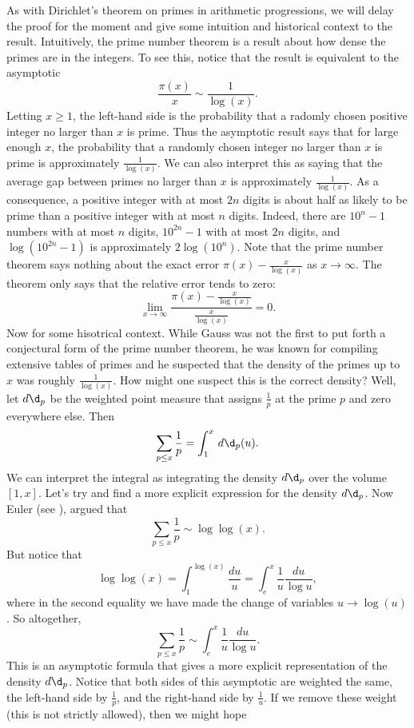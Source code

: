       As with Dirichlet's theorem on primes in arithmetic progressions, we will delay the proof for the moment and give some intuition and historical context to the result. Intuitively, the prime number theorem is a result about how dense the primes are in the integers. To see this, notice that the result is equivalent to the asymptotic
      \[
        \frac{\pi(x)}{x} \sim \frac{1}{\log(x)}.
      \]
      Letting $x \ge 1$, the left-hand side is the probability that a radomly chosen positive integer no larger than $x$ is prime. Thus the asymptotic result says that for large enough $x$, the probability that a randomly chosen integer no larger than $x$ is prime is approximately $\frac{1}{\log(x)}$. We can also interpret this as saying that the average gap between primes no larger than $x$ is approximately $\frac{1}{\log(x)}$. As a consequence, a positive integer with at most $2n$ digits is about half as likely to be prime than a positive integer with at most $n$ digits. Indeed, there are $10^{n}-1$ numbers with at most $n$ digits, $10^{2n}-1$ with at most $2n$ digits, and $\log(10^{2n}-1)$ is approximately $2\log(10^{n})$. Note that the prime number theorem says nothing about the exact error $\pi(x)-\frac{x}{\log(x)}$ as $x \to \infty$. The theorem only says that the relative error tends to zero:
      \[
        \lim_{x \to \infty}\frac{\pi(x)-\frac{x}{\log(x)}}{\frac{x}{\log(x)}} = 0.
      \]
      Now for some hisotrical context. While Gauss was not the first to put forth a conjectural form of the prime number theorem, he was known for compiling extensive tables of primes and he suspected that the density of the primes up to $x$ was roughly $\frac{1}{\log(x)}$. How might one suspect this is the correct density? Well, let $d\d_{p}$ be the weighted point measure that assigns $\frac{1}{p}$ at the prime $p$ and zero everywhere else. Then
      \[
        \sum_{p \le x}\frac{1}{p} = \int_{1}^{x}\,d\d_{p}(u).
      \]
      We can interpret the integral as integrating the density $d\d_{p}$ over the volume $[1,x]$. Let's try and find a more explicit expression for the density $d\d_{p}$. Now Euler (see \cite{euler1744variae}), argued that
      \[
        \sum_{p \le x}\frac{1}{p} \sim \log\log(x).
      \]
      But notice that
      \[
        \log\log(x) = \int_{1}^{\log(x)}\frac{du}{u} = \int_{e}^{x}\frac{1}{u}\frac{du}{\log{u}},
      \]
      where in the second equality we have made the change of variables $u \to \log(u)$. So altogether,
      \[
        \sum_{p \le x}\frac{1}{p} \sim \int_{e}^{x}\frac{1}{u}\frac{du}{\log{u}}.
      \]
      This is an asymptotic formula that gives a more explicit representation of the density $d\d_{p}$. Notice that both sides of this asymptotic are weighted the same, the left-hand side by $\frac{1}{p}$, and the right-hand side by $\frac{1}{u}$. If we remove these weight (this is not strictly allowed), then we might hope
